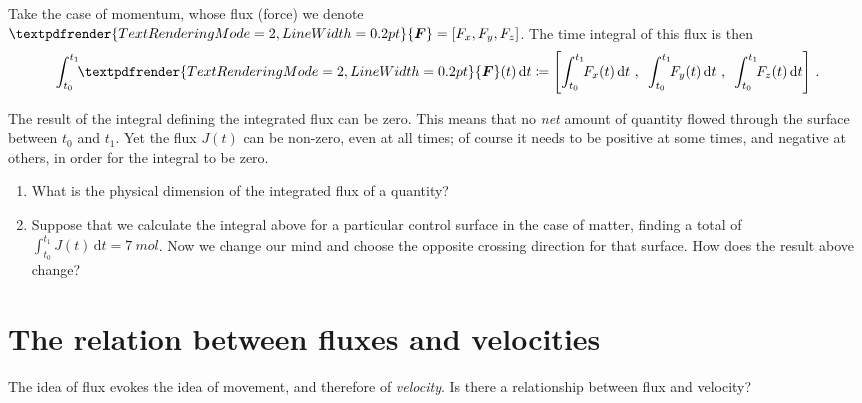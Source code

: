 \documentclass[a4paper,12pt,%
onecolumn,oneside,%
british%
]{memoir}
\renewcommand*{\bm}[1]{\textpdfrender{TextRenderingMode=2,LineWidth=0.2pt}{\boldsymbol{#1}}}
\newcommand*{\di}{\mathrm{d}}%
\newcommand*{\defd}{\coloneqq}
\renewcommand*{\|}[1][]{\nonscript\:#1\vert\nonscript\:\mathopen{}}
\newcommand*{\yti}{t_{0}}
\newcommand*{\ytf}{t_{1}}
\newcommand*{\yJ}{J}
\newcommand*{\yF}{\bm{F}}
\begin{document}
Take the case of momentum, whose flux (force) we denote $\yF=[F_{x}, F_{y}, F_{z}]$. The time integral of this flux is then
\begin{equation}
  \label{eq:total_flow_integral_vector}
  \int_{\yti}^{\ytf}\!\! \yF(t)\,\di t \defd
  \Biggl[
  \int_{\yti}^{\ytf}\!\! F_{x}(t)\,\di t \ ,\enskip
  \int_{\yti}^{\ytf}\!\! F_{y}(t)\,\di t \ ,\enskip
  \int_{\yti}^{\ytf}\!\! F_{z}(t)\,\di t
  \Biggr] \ .
\end{equation}

\medskip

\begin{warning}
  The result of the integral defining the integrated flux can be zero. This means that no \emph{net} amount of quantity flowed through the surface between $\yti$ and $\ytf$. Yet the flux $\yJ(t)$ can be non-zero, even at all times; of course it needs to be positive at some times, and negative at others, in order for the integral to be zero.
\end{warning}

\medskip

\begin{exercise}
  \begin{enumerate}[exerc]
  \item What is the physical dimension of the integrated flux of a quantity?
  \item Suppose that we calculate the integral above for a particular control surface in the case of matter, finding a total of $\int_{\yti}^{\ytf}\!\! \yJ(t)\,\di t = \qty{7}{mol}$. Now we change our mind and choose the opposite crossing direction for that surface. How does the result above change?
  \end{enumerate}
\end{exercise}

\section{The relation between fluxes and velocities}
\label{sec:fluxes_velocities}

The idea of flux evokes the idea of movement, and therefore of \emph{velocity}. Is there a relationship between flux and velocity?
\end{document}
